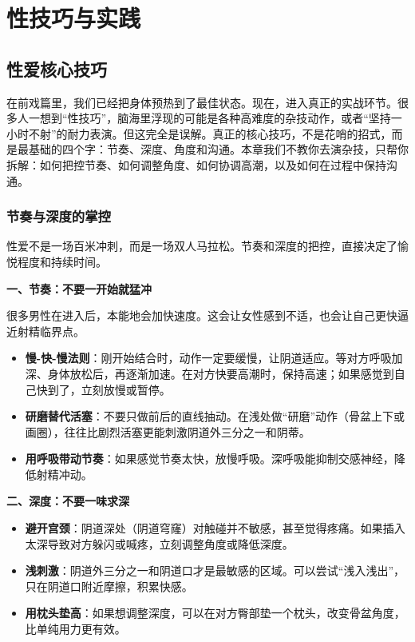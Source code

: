 \documentclass[12pt,UTF8]{ctexbook}
\begin{document}
\part{性技巧与实践}

\chapter{性爱核心技巧}

在前戏篇里，我们已经把身体预热到了最佳状态。现在，进入真正的实战环节。很多人一想到“性技巧”，脑海里浮现的可能是各种高难度的杂技动作，或者“坚持一小时不射”的耐力表演。但这完全是误解。真正的核心技巧，不是花哨的招式，而是最基础的四个字：节奏、深度、角度和沟通。本章我们不教你去演杂技，只帮你拆解：如何把控节奏、如何调整角度、如何协调高潮，以及如何在过程中保持沟通。

\section{节奏与深度的掌控}

性爱不是一场百米冲刺，而是一场双人马拉松。节奏和深度的把控，直接决定了愉悦程度和持续时间。

\textbf{一、节奏：不要一开始就猛冲}

很多男性在进入后，本能地会加快速度。这会让女性感到不适，也会让自己更快逼近射精临界点。

\begin{itemize}
\item \textbf{慢-快-慢法则}：刚开始结合时，动作一定要缓慢，让阴道适应。等对方呼吸加深、身体放松后，再逐渐加速。在对方快要高潮时，保持高速；如果感觉到自己快到了，立刻放慢或暂停。
\item \textbf{研磨替代活塞}：不要只做前后的直线抽动。在浅处做“研磨”动作（骨盆上下或画圈），往往比剧烈活塞更能刺激阴道外三分之一和阴蒂。
\item \textbf{用呼吸带动节奏}：如果感觉节奏太快，放慢呼吸。深呼吸能抑制交感神经，降低射精冲动。
\end{itemize}

\textbf{二、深度：不要一味求深}

\begin{itemize}
\item \textbf{避开宫颈}：阴道深处（阴道穹窿）对触碰并不敏感，甚至觉得疼痛。如果插入太深导致对方躲闪或喊疼，立刻调整角度或降低深度。
\item \textbf{浅刺激}：阴道外三分之一和阴道口才是最敏感的区域。可以尝试“浅入浅出”，只在阴道口附近摩擦，积累快感。
\item \textbf{用枕头垫高}：如果想调整深度，可以在对方臀部垫一个枕头，改变骨盆角度，比单纯用力更有效。
\end{itemize}
\end{document}

